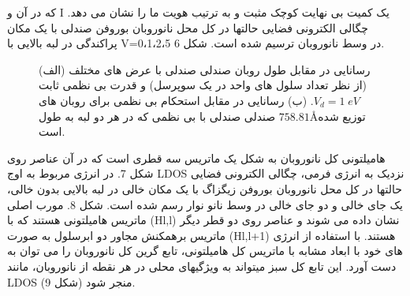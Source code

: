 که در آن و I یک کمیت بی نهایت کوچک مثبت و به ترتیب هویت ما را نشان می دهد. چگالی الکترونی فضایی حالتها در کل محل نانوروبان بوروفن صندلی با یک مکان پراکندگی در لبه بالایی با V=0،1،2،5 در وسط نانوروبان ترسیم شده است. شکل 6.

\begin{figure}[!ht]
    \centering
    
    \caption{(الف) رسانایی در مقابل طول روبان صندلی صندلی با عرض های مختلف (از نظر تعداد سلول های واحد در یک سوپرسل) و قدرت بی نظمی ثابت $V_d=1\;eV$. (ب) رسانایی در مقابل استحکام بی نظمی برای روبان های صندلی صندلی با بی نظمی که در هر دو لبه به طول $758.81$\AA توزیع شده است.}
    \label{armchair-width-strangth}
  \end{figure}
  
هامیلتونی کل نانوروبان به شکل یک ماتریس سه قطری است که در آن عناصر روی شکل 7. در انرژی مربوط به اوج LDOS نزدیک به انرژی فرمی، چگالی الکترونی فضایی حالتها در کل محل نانوروبان بوروفن زیگزاگ با یک مکان خالی در لبه بالایی بدون خالی، یک جای خالی و دو جای خالی در وسط نانو نوار رسم شده است. شکل 8. 
مورب اصلی ماتریس هامیلتونی هستند که با (Hl,l) نشان داده می شوند و عناصر روی دو قطر دیگر ماتریس برهمکنش مجاور دو ابرسلول به صورت (Hl,l+1) هستند. با استفاده از انرژی های خود با ابعاد مشابه با ماتریس کل هامیلتونی، تابع گرین کل نانوروبان را می توان به دست آورد. این تابع کل سبز میتواند به ویژگیهای محلی در هر نقطه از نانوروبان، مانند LDOS منجر شود (شکل 9).


